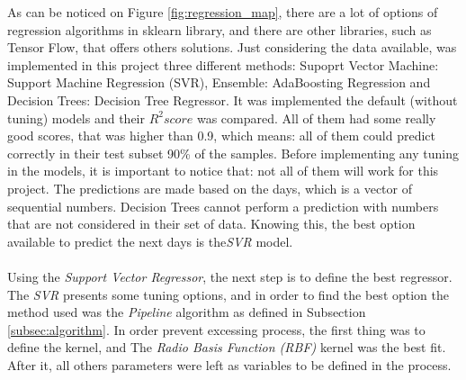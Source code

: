 As can be noticed on Figure \ref{fig:regression_map}, there are a lot of options of regression algorithms in sklearn library, and there are other libraries, such as Tensor Flow, that offers
others solutions. Just considering the data available, was implemented in this project three different methods: Supoprt Vector Machine: Support Machine Regression (SVR), Ensemble: AdaBoosting Regression
and Decision Trees: Decision Tree Regressor. It was implemented the default (without tuning) models and their $R^2 score$ was compared. All of them had some really good scores, that was higher
than 0.9, which means: all of them could predict correctly in their test subset 90\% of the samples. Before implementing any tuning in the models, it is important to notice that: not all of them
will work for this project. The predictions are made based on the days, which is a vector of sequential numbers. Decision Trees cannot perform a prediction with numbers that are not considered
in their set of data. Knowing this, the best option available to predict the next days is the\textit{SVR} model.\\
\\
Using the \textit{Support Vector Regressor}, the next step is to define the best regressor. The \textit{SVR} presents some tuning options, and in order to find the best option the method used
was the \textit{Pipeline} algorithm as defined in Subsection \ref{subsec:algorithm}. In order prevent excessing process, the first thing was to define the kernel, and The \textit{Radio Basis Function (RBF)}
kernel was the best fit. After it, all others parameters were left as variables to be defined in the process.\\


